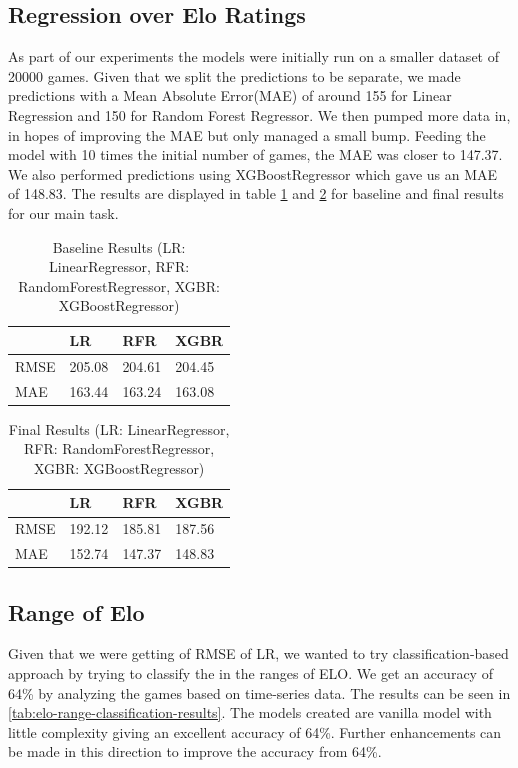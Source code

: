 \documentclass[11pt,a4paper]{article}
\begin{document}
\subsection{Regression over Elo Ratings}
As part of our experiments the models were initially run on a smaller dataset of 20000 games. Given that we split the predictions to be separate, we made predictions with a Mean Absolute Error(MAE) of around 155 for Linear Regression and 150 for Random Forest Regressor. We then pumped more data in, in hopes of improving the MAE but only managed a small bump. Feeding the model with 10 times the initial number of games, the MAE was closer to 147.37. We also performed predictions using XGBoostRegressor which gave us an MAE of 148.83. The results are displayed in table \ref{tab:baseline-results} and \ref{tab:final-results} for baseline and final results for our main task.

\begin{table}[]
\begin{tabular}{|l|l|l|l|}
\hline
 & LR & RFR & XGBR \\ \hline
RMSE & 205.08 & 204.61 & 204.45 \\ \hline
MAE & 163.44 & 163.24 & 163.08 \\ \hline
\end{tabular}
\caption{Baseline Results (LR: LinearRegressor, RFR: RandomForestRegressor, XGBR: XGBoostRegressor)}
\label{tab:baseline-results}
\end{table}

\begin{table}[]
\begin{tabular}{|l|l|l|l|}
\hline
 & LR & RFR & XGBR \\ \hline
RMSE & 192.12 & 185.81 & 187.56 \\ \hline
MAE & 152.74 & 147.37 & 148.83 \\ \hline
\end{tabular}
\caption{Final Results (LR: LinearRegressor, RFR: RandomForestRegressor, XGBR: XGBoostRegressor)}
\label{tab:final-results}
\end{table}

\subsection{Range of Elo}
Given that we were getting of RMSE of LR, we wanted to try classification-based approach by trying to classify the in the ranges of ELO. We get an accuracy of 64\% by analyzing the games based on time-series data. The results can be seen in \ref{tab:elo-range-classification-results}. The models created are vanilla model with little complexity giving an excellent accuracy of 64\%. Further enhancements can be made in this direction to improve the accuracy from 64\%.
\end{document}
